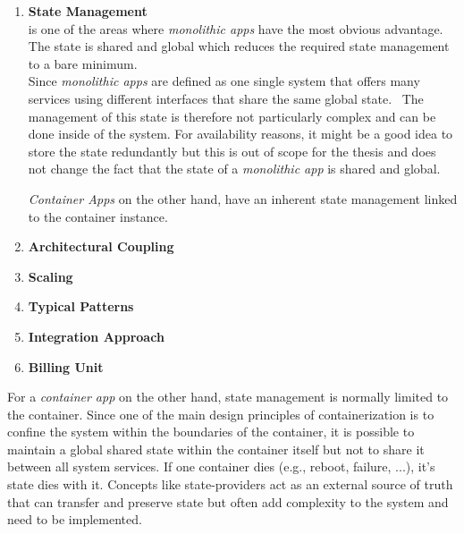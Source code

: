 \begin{enumerate}
    \begin{enumerate}
        \item \textbf{State Management}\\
        is one of the areas where \textit{monolithic apps} have the most obvious advantage. The state is shared and global which reduces the required state management to a bare minimum.\\
        Since \textit{monolithic apps} are defined as one single system that offers many services using different interfaces that share the same global state.~ The management of this state is therefore not particularly complex and can be done inside of the system. For availability reasons, it might be a good idea to store the state redundantly but this is out of scope for the thesis and does not change the fact that the state of a \textit{monolithic app} is shared and global.
        
        \textit{Container Apps} on the other hand, have an inherent state management linked to the container instance. 
        
        \item \textbf{Architectural Coupling}
        
        \item \textbf{Scaling}
        
        \item \textbf{Typical Patterns}
        
        \item \textbf{Integration Approach}
        
        \item \textbf{Billing Unit}
    \end{enumerate}
    
       
    
    For a \textit{container app} on the other hand, state management is normally limited to the container. Since one of the main design principles of containerization is to confine the system within the boundaries of the container, it is possible to maintain a global shared state within the container itself but not to share it between all system services. If one container dies (e.g., reboot, failure, ...), it's state dies with it. Concepts like state-providers act as an external source of truth that can transfer and preserve state but often add complexity to the system and need to be implemented.~
    
    
\end{enumerate}
    

